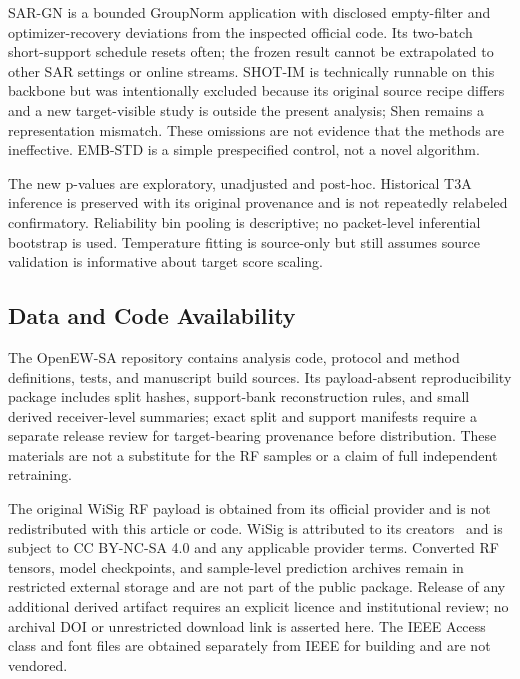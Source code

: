 SAR-GN is a bounded GroupNorm application with disclosed empty-filter and optimizer-recovery deviations from the inspected official code. Its two-batch short-support schedule resets often; the frozen result cannot be extrapolated to other SAR settings or online streams. SHOT-IM is technically runnable on this backbone but was intentionally excluded because its original source recipe differs and a new target-visible study is outside the present analysis; Shen remains a representation mismatch. These omissions are not evidence that the methods are ineffective. EMB-STD is a simple prespecified control, not a novel algorithm.

The new p-values are exploratory, unadjusted and post-hoc. Historical T3A inference is preserved with its original provenance and is not repeatedly relabeled confirmatory. Reliability bin pooling is descriptive; no packet-level inferential bootstrap is used. Temperature fitting is source-only but still assumes source validation is informative about target score scaling.

\subsection{Data and Code Availability}
The OpenEW-SA repository contains analysis code, protocol and method definitions, tests, and manuscript build sources. Its payload-absent reproducibility package includes split hashes, support-bank reconstruction rules, and small derived receiver-level summaries; exact split and support manifests require a separate release review for target-bearing provenance before distribution. These materials are not a substitute for the RF samples or a claim of full independent retraining.

The original WiSig RF payload is obtained from its official provider and is not redistributed with this article or code. WiSig is attributed to its creators~\cite{wisig,orbit} and is subject to CC BY-NC-SA 4.0 and any applicable provider terms. Converted RF tensors, model checkpoints, and sample-level prediction archives remain in restricted external storage and are not part of the public package. Release of any additional derived artifact requires an explicit licence and institutional review; no archival DOI or unrestricted download link is asserted here. The IEEE Access class and font files are obtained separately from IEEE for building and are not vendored.

